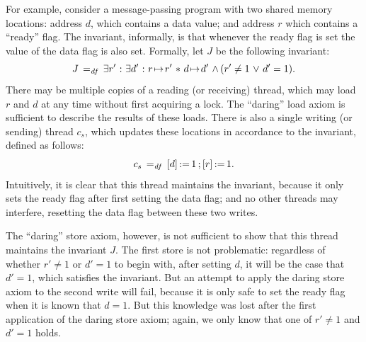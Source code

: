 \documentclass[11pt]{report}         %
\begin{document}
For example, consider a message-passing program with two shared memory locations: address $d$, which contains a data value; and address $r$ which contains a ``ready'' flag. The invariant, informally, is that whenever the ready flag is set the value of the data flag is also set. Formally, let $J$ be the following invariant: \[ J \operatorname{\;=_{\mathit{df}}\;} \exists r' \operatorname{\,:\,} \exists d' \operatorname{\,:\,} r \!\mapsto\! r' \operatorname{\,\ast\,} d \!\mapsto\! d' \operatorname{\,\wedge\,} (r' \neq 1 \operatorname{\,\vee\,} d' = 1).\] There may be multiple copies of a reading (or receiving) thread, which may load $r$ and $d$ at any time without first acquiring a lock. The ``daring'' load axiom is sufficient to describe the results of these loads. There is also a single writing (or sending) thread $c_s$, which updates these locations in accordance to the invariant, defined as follows: \[ c_s \operatorname{\;=_{\mathit{df}}\;} \left[ d \right] \operatorname{:\!=} 1 \operatorname{;} \left[ r \right] \operatorname{:\!=} 1.\] Intuitively, it is clear that this thread maintains the invariant, because it only sets the ready flag after first setting the data flag; and no other threads may interfere, resetting the data flag between these two writes. 

The ``daring'' store axiom, however, is not sufficient to show that this thread maintains the invariant $J$. The first store is not problematic: regardless of whether $r' \neq 1$ or $d' = 1$ to begin with, after setting $d$, it will be the case that $d' = 1$, which satisfies the invariant. But an attempt to apply the daring store axiom to the second write will fail, because it is only safe to set the ready flag when it is known that $d = 1$. But this knowledge was lost after the first application of the daring store axiom; again, we only know that one of $r' \neq 1$ and $d' = 1$ holds. 
\end{document}
